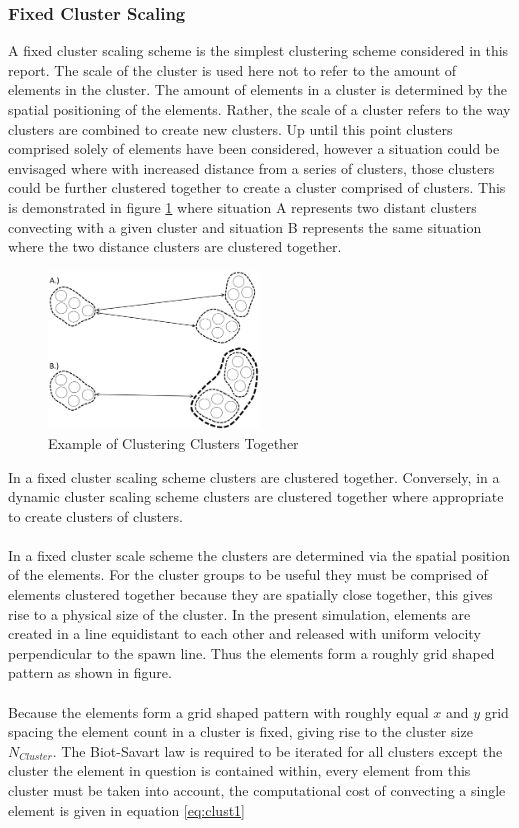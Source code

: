 \subsubsection{Fixed Cluster Scaling}
A fixed cluster scaling scheme is the simplest clustering scheme considered in this report. The scale of the cluster is used here not to refer to the amount of elements in the cluster. The amount of elements in a cluster is determined by the spatial positioning of the elements. Rather, the scale of a cluster refers to the way clusters are combined to create new clusters. Up until this point clusters comprised solely of elements have been considered, however a situation could be  envisaged where with increased distance from a series of clusters, those clusters could be further clustered together to create a cluster comprised of clusters. This is demonstrated in figure \ref{fig:ClustClust} where situation A represents two distant clusters convecting with a given cluster and situation B represents the same situation where the two distance clusters are clustered together.

\begin{figure}[H]
\centering
\includegraphics[width=0.5\textwidth]{Figures/ClusterCluster.png}
\caption{\label{fig:ClustClust}Example of Clustering Clusters Together}
\end{figure}

In a fixed cluster scaling scheme clusters are clustered together. Conversely, in a dynamic cluster scaling scheme clusters are clustered together where appropriate to create clusters of clusters.
\\\\
In a fixed cluster scale scheme the clusters are determined via the spatial position of the elements. For the cluster groups to be useful they must be comprised of elements clustered together because they are spatially close together, this gives rise to a physical size of the cluster. In the present simulation, elements are created in a line equidistant to each other and released with uniform velocity perpendicular to the spawn line. Thus the 
elements form a roughly grid shaped pattern as shown in figure.
\\\\
Because the elements form a grid shaped pattern with roughly equal $x$ and $y$ grid spacing the element count in a cluster is fixed, giving rise to the cluster size $N_{Cluster}$. The Biot-Savart law is required to be iterated for all clusters except the cluster the element in question is contained within,  every element from this cluster must be taken into account, the computational cost of convecting a single element is given in equation \ref{eq:clust1}

